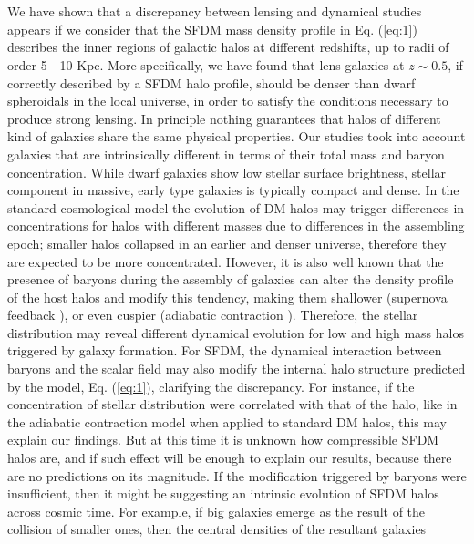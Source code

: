 \documentclass[10pt,twoside,twocolumn]{article}
\begin{document}
    \section{}
    We have shown that a discrepancy between lensing and
dynamical studies appears if we consider that the SFDM
mass density profile in Eq. (\ref{eq:1}) describes the inner regions
of galactic halos at different redshifts, up to radii of order
5 - 10 Kpc. More specifically, we have found that lens
galaxies at $z\sim0.5$, if correctly described by a SFDM halo
profile, should be denser than dwarf spheroidals in the
local universe, in order to satisfy the conditions necessary
to produce strong lensing.
In principle nothing guarantees that halos of different kind of galaxies share the same physical properties.
Our studies took into account galaxies that are intrinsically different in terms of their total mass and baryon
concentration. While dwarf galaxies show low stellar surface brightness, stellar component in massive, early type
galaxies is typically compact and dense.
In the standard cosmological model the evolution of
DM halos may trigger differences in concentrations for
halos with different masses due to differences in the assembling epoch; smaller halos collapsed in an earlier and
denser universe, therefore they are expected to be more
concentrated. However, it is also well known that the
presence of baryons during the assembly of galaxies can
alter the density profile of the host halos and modify
this tendency, making them shallower (supernova feedback \cite{23}), or even cuspier (adiabatic contraction \cite{24}).
Therefore, the stellar distribution may reveal different
dynamical evolution for low and high mass halos triggered by galaxy formation.
For SFDM, the dynamical interaction between baryons
and the scalar field may also modify the internal halo
structure predicted by the model, Eq. (\ref{eq:1}), clarifying the
discrepancy. For instance, if the concentration of stellar distribution were correlated with that of the halo,
like in the adiabatic contraction model when applied to
standard DM halos, this may explain our findings. But
at this time it is unknown how compressible SFDM halos are, and if such effect will be enough to explain our
results, because there are no predictions on its magnitude. If the modification triggered by baryons were insufficient, then it might be suggesting an intrinsic evolution
of SFDM halos across cosmic time. For example, if big
galaxies emerge as the result of the collision of smaller
ones, then the central densities of the resultant galaxies
\end{document}
